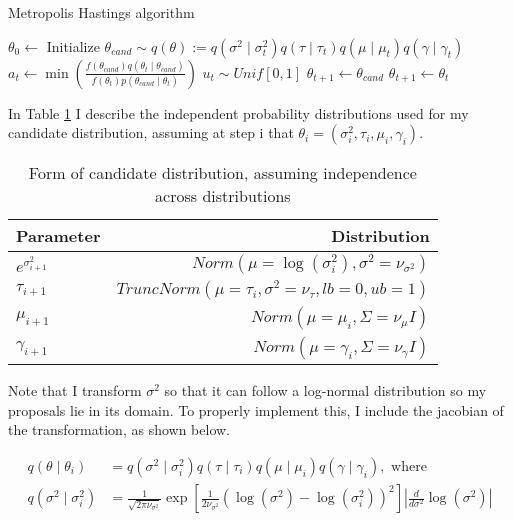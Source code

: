 \documentclass{article}
\begin{document}
\begin{algorithm}[h]
  \caption{\label{alg:mh}Metropolis Hastings algorithm}
    \begin{algorithmic}[1]
      \State $\theta_0 \longleftarrow$  Initialize
        \State $\theta_{cand} \sim q(\theta) := q(\sigma^2\mid\sigma^2_t)q(\tau\mid\tau_t)q(\mu\mid\mu_t)q(\gamma \mid \gamma_t)$
        \State $a_t \longleftarrow \min\left(\frac{f(\theta_{cand})q(\theta_t\mid\theta_{cand})}{f(\theta_t)p(\theta_{cand}\mid\theta_t)}\right)$
        \State $u_t \sim Unif[0,1]$
          \State $\theta_{t+1} \longleftarrow \theta_{cand}$
        \Else 
          \State $\theta_{t+1} \longleftarrow \theta_t$
        \EndIf
      \EndFor
    \end{algorithmic}
  \end{algorithm}


In Table \ref{tab:mh_cand} I describe the independent probability distributions used for my candidate distribution, assuming at step i that $\theta_i = (\sigma^2_i, \tau_i, \mu_i, \gamma_i)$.

\begin{table}[H]
  \small
  \begin{center}
    \begin{tabular}{lr}
    \textbf{Parameter} & \textbf{Distribution} \\
    \midrule
    $e^{\sigma^2_{i+1}}$ & $Norm(\mu=\log(\sigma^2_i), \sigma^2=\nu_{\sigma^2})$\\
    $\tau_{i+1}$ & $TruncNorm(\mu=\tau_i, \sigma^2=\nu_{\tau}, lb=0, ub=1)$\\
    $\mu_{i+1}$ & $Norm(\mu=\mu_i, \Sigma=\nu_{\mu}I)$\\
    $\gamma_{i+1}$ & $Norm(\mu=\gamma_i, \Sigma=\nu_{\gamma}I)$\\
    \bottomrule
    \end{tabular}
    \end{center}
    \caption{\label{tab:mh_cand} Form of candidate distribution, assuming independence across distributions}
\end{table}

Note that I transform $\sigma^2$ so that it can follow a log-normal distribution so my proposals lie in its domain. To properly implement this, I include the jacobian of the transformation, as shown below.

\begin{align}
  q(\theta \mid \theta_i) &=  q(\sigma^2\mid\sigma^2_i) q(\tau\mid\tau_i)q(\mu\mid\mu_i)q(\gamma \mid \gamma_i), \textrm{ where }\\
  q(\sigma^2 \mid \sigma^2_i) &= \frac{1}{\sqrt{2\pi\nu_{\sigma^2}}}\exp\left[\frac{1}{2\nu_{\sigma^2}}\left(\log(\sigma^2) - \log(\sigma^2_i)\right)^2\right]\left| \frac{d}{d\sigma^2}\log(\sigma^2)\right|  
\end{align}
\end{document}
